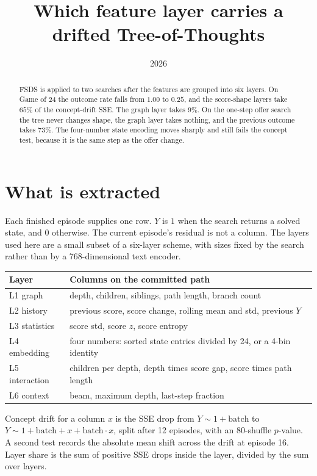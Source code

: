 \documentclass[11pt,a4paper]{article}
\title{Which feature layer carries a drifted Tree-of-Thoughts}
\author{}
\date{2026}
\begin{document}
\maketitle

\begin{abstract}
FSDS is applied to two searches after the features are grouped into six layers.
On Game of 24 the outcome rate falls from \(1.00\) to \(0.25\), and the score-shape layers take \(65\%\) of the concept-drift SSE.
The graph layer takes \(9\%\).
On the one-step offer search the tree never changes shape, the graph layer takes nothing, and the previous outcome takes \(73\%\).
The four-number state encoding moves sharply and still fails the concept test, because it is the same step as the offer change.
\end{abstract}

\section{What is extracted}
Each finished episode supplies one row.
\(Y\) is \(1\) when the search returns a solved state, and \(0\) otherwise.
The current episode's residual is not a column.
The layers used here are a small subset of a six-layer scheme, with sizes fixed by the search rather than by a 768-dimensional text encoder.

\begin{center}
\begin{tabular}{ll}
\toprule
Layer & Columns on the committed path \\
\midrule
L1 graph & depth, children, siblings, path length, branch count \\
L2 history & previous score, score change, rolling mean and std, previous \(Y\) \\
L3 statistics & score std, score \(z\), score entropy \\
L4 embedding & four numbers: sorted state entries divided by 24, or a 4-bin identity \\
L5 interaction & children per depth, depth times score gap, score times path length \\
L6 context & beam, maximum depth, last-step fraction \\
\bottomrule
\end{tabular}
\end{center}

Concept drift for a column \(x\) is the SSE drop from \(Y\sim 1+\mathrm{batch}\) to \(Y\sim 1+\mathrm{batch}+x+\mathrm{batch}\cdot x\), split after 12 episodes, with an 80-shuffle \(p\)-value.
A second test records the absolute mean shift across the drift at episode 16.
Layer share is the sum of positive SSE drops inside the layer, divided by the sum over layers.
\end{document}
